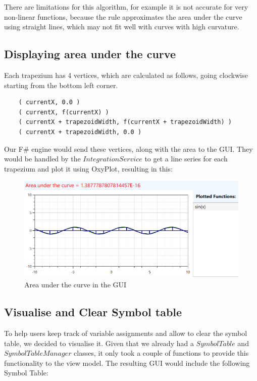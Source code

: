\documentclass[a4paper, oneside, 11pt]{report}
\begin{document}
There are limitations for this algorithm, for example it is not accurate for very non-linear functions, because the rule approximates the area under the curve using straight lines, which may not fit well with curves with high curvature.

\subsection{Displaying area under the curve}
 Each trapezium has 4 vertices, which are calculated as follows, going clockwise starting from the bottom left corner.
\begin{verbatim}
    ( currentX, 0.0 )
    ( currentX, f(currentX) )
    ( currentX + trapezoidWidth, f(currentX + trapezoidWidth) )
    ( currentX + trapezoidWidth, 0.0 )
\end{verbatim}

Our F\# engine would send these vertices, along with the area to the GUI. They would be handled by the $IntegrationService$ to get a line series for each trapezium and plot it using OxyPlot, resulting in this:

\begin{figure}[H]
\begin{center}
\includegraphics[scale=0.7]{Area under the curve.png}
\caption{Area under the curve in the GUI}
\label{basicgui}
\end{center}
\end{figure}

\subsection{Visualise and Clear Symbol table}
To help users keep track of variable assignments and allow to clear the symbol table, we decided to visualise it. Given that we already had a $SymbolTable$ and $SymbolTableManager$ classes, it only took a couple of functions to provide this functionality to the view model. The resulting GUI would include the following Symbol Table:
\end{document}
